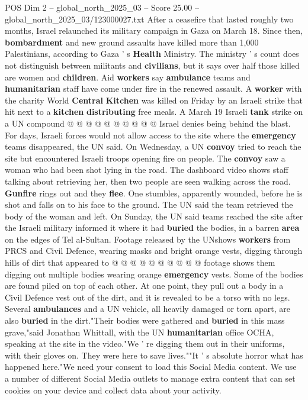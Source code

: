 \begin{textsample}{POS Dim 2 – global\_north\_2025\_03 – Score 25.00 – global\_north\_2025\_03/123000027.txt}
After a ceasefire that lasted roughly two months, Israel relaunched its military campaign in Gaza on March 18.
Since then, \textbf{bombardment} and new ground assaults have killed more than 1,000 Palestinians, according to Gaza ' s \textbf{Health} Ministry.
The ministry ' s count does not distinguish between militants and \textbf{civilians}, but it says over half those killed are women and \textbf{children}.
Aid \textbf{workers} say \textbf{ambulance} teams and \textbf{humanitarian} staff have come under fire in the renewed assault.
A \textbf{worker} with the charity World \textbf{Central} \textbf{Kitchen} was killed on Friday by an Israeli strike that hit next to a \textbf{kitchen} \textbf{distributing} free meals.
A March 19 Israeli \textbf{tank} strike on a UN compound @ @ @ @ @ @ @ @ @ @ Israel denies being behind the blast.
For days, Israeli forces would not allow access to the site where the \textbf{emergency} teams disappeared, the UN said.
On Wednesday, a UN \textbf{convoy} tried to reach the site but encountered Israeli troops opening fire on people.
The \textbf{convoy} saw a woman who had been shot lying in the road.
The dashboard video shows staff talking about retrieving her, then two people are seen walking across the road. \textbf{Gunfire} rings out and they \textbf{flee}.
One stumbles, apparently wounded, before he is shot and falls on to his face to the ground.
The UN said the team retrieved the body of the woman and left.
On Sunday, the UN said teams reached the site after the Israeli military informed it where it had \textbf{buried} the bodies, in a barren \textbf{area} on the edges of Tel al-Sultan.
Footage released by the UNshows \textbf{workers} from PRCS and Civil Defence, wearing masks and bright orange vests, digging through hills of dirt that appeared to @ @ @ @ @ @ @ @ @ @ footage shows them digging out multiple bodies wearing orange \textbf{emergency} vests.
Some of the bodies are found piled on top of each other.
At one point, they pull out a body in a Civil Defence vest out of the dirt, and it is revealed to be a torso with no legs.
Several \textbf{ambulances} and a UN vehicle, all heavily damaged or torn apart, are also \textbf{buried} in the dirt."Their bodies were gathered and \textbf{buried} in this mass grave,"said Jonathan Whittall, with the UN \textbf{humanitarian} office OCHA, speaking at the site in the video."We ' re digging them out in their uniforms, with their gloves on.
They were here to save lives.""It ' s absolute horror what has happened here."We need your consent to load this Social Media content.
We use a number of different Social Media outlets to manage extra content that can set cookies on your device and collect data about your activity.

\end{textsample}
